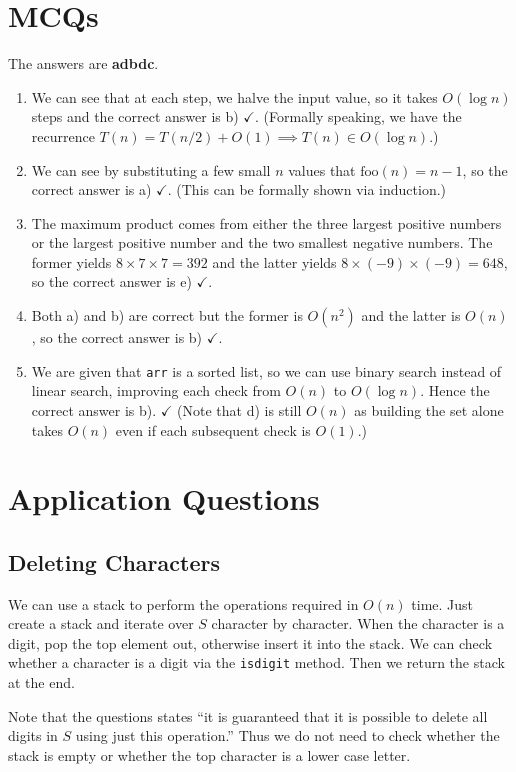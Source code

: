 \documentclass[12pt]{article}
\renewcommand{\t}{\texttt}
\begin{document}
\section{MCQs}
The answers are \textbf{adbdc}.
\begin{enumerate}
\item We can see that at each step, we halve the input value, so it takes $O(\log n)$ steps and the correct answer is b) $\checkmark$. (Formally speaking, we have the recurrence $T(n)=T(n/2)+O(1)\implies T(n)\in O(\log n)$.)
\item We can see by substituting a few small $n$ values that $\mathrm{foo}(n)=n-1$, so the correct answer is a) $\checkmark$. (This can be formally shown via induction.)
\item The maximum product comes from either the three largest positive numbers or the largest positive number and the two smallest negative numbers. The former yields $8\times7\times7=392$ and the latter yields $8\times(-9)\times(-9)=648$, so the correct answer is e) $\checkmark$.
\item Both a) and b) are correct but the former is $O\left(n^2\right)$ and the latter is $O(n)$, so the correct answer is b) $\checkmark$.
\item We are given that \t{arr} is a sorted list, so we can use binary search instead of linear search, improving each check from $O(n)$ to $O(\log n)$. Hence the correct answer is b). $\checkmark$ (Note that d) is still $O(n)$ as building the set alone takes $O(n)$ even if each subsequent check is $O(1)$.) 
\end{enumerate}
\section{Application Questions}
\subsection{Deleting Characters}
We can use a stack to perform the operations required in $O(n)$ time. Just create a stack and iterate over $S$ character by character. When the character is a digit, pop the top element out, otherwise insert it into the stack. We can check whether a character is a digit via the \t{isdigit} method. Then we return the stack at the end.

Note that the questions states ``it is guaranteed that it is possible to delete all digits in $S$ using just this operation.'' Thus we do not need to check whether the stack is empty or whether the top character is a lower case letter. 
\end{document}
